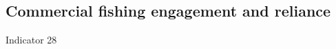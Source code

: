\documentclass[
  letterpaper,
  oneside,
  open=any]{scrbook}
\begin{document}
\subsection{Commercial fishing engagement and
reliance}\label{commercial-fishing-engagement-and-reliance}

Indicator 28

\begin{figure}


\caption{\label{fig-PRengage}}

\end{figure}%

\begin{figure}


\caption{\label{fig-PRreliance}}

\end{figure}%
\end{document}

